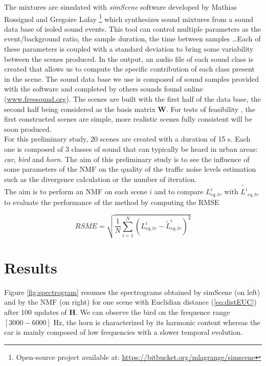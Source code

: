 \documentclass{article}
\begin{document}
\begin{sloppy}
The mixtures are simulated with \textit{simScene} software developed by Mathias Rossignol and Gregoire Lafay \cite{simScene} \footnote{Open-source project available at: \url{https://bitbucket.org/mlagrange/simscene}} which synthesizes sound mixtures from a sound data base of isoled sound events. This tool can control multiple parameters as the event/background ratio, the sample duration, the time between samples \dots Each of these parameters is coupled with a standard deviation to bring some variability between the scenes produced. In the output, an audio file of each sound class is created that allows us to compute the specific contribution of each class present in the scene. The sound data base we use is composed of sound samples provided with the software and completed by others sounds found online (\url{www.freesound.org}). The scenes are built with the first half of the data base, the second half being considered as the basis matrix $\mathbf{W}$. For tests of feasibility , the first constructed scenes are simple, more realistic scenes fully consistent will be soon produced.\\

For this preliminary study, 20 scenes are created with a duration of 15 s. Each one is composed of 3 classes of sound that can typically be heard in urban areas: \textit{car}, \textit{bird} and \textit{horn}. The aim of this preliminary study is to see the influence of some parameters of the NMF on the quality of the traffic noise levels estimation such as the divergence calculation or the number of iteration.\\

The aim is to perform an NMF on each scene $i$ and to compare $L^i_{eq,tr}$ with $\tilde{L^i}_{eq,tr}$ to evaluate the performance of the method by computing the RMSE

\begin{equation}
RSME = \sqrt{\frac{1}{N}\sum_{i = 1}^N(L^i_{eq,tr}-\tilde{L}^i_{eq,tr})^2}
\end{equation}

\section{Results}\label{sec:results}

Figure \ref{fig:spectrogram} resumes the spectrograms obtained by simScene (on left) and by the NMF (on right) for one scene with Euclidian distance (\ref{eq:distEUC}) after 100 updates of $\mathbf{H}$. We can observe the bird on the frequence range $\left[3000-6000\right]$ Hz, the horn is characterized by its harmonic content whereas the car is mainly composed of low frequencies with a slower temporal evolution.\\


\end{sloppy}
\end{document}
